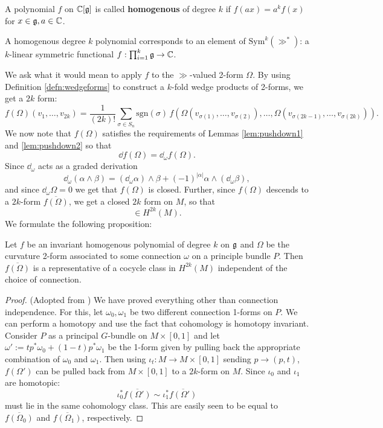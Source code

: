 		\begin{defn}
			A polynomial $f$ on $\mathbb{C}[\frak{g}]$ is called \textbf{homogenous} of degree $k$ if $f(a x) = a^k f(x)$ for $x \in \frak{g}, a \in \mathbb{C}$.
		\end{defn}
		
		\begin{obs}
			A homogenous degree $k$ polynomial corresponds to an element of $\mathrm{Sym}^k (\gg^*)$: a $k$-linear symmetric functional $f: \prod_{i=1}^k \frak{g} \to \mathbb{C}$.
		\end{obs}
		
		We ask what it would mean to apply $f$ to the $\gg$-valued 2-form $\Omega$. By using Definition \ref{defn:wedgeforms} to construct a $k$-fold wedge products of 2-forms, we get a $2k$ form:
		\[
			f(\Omega)(v_1, \dots, v_{2k}) = \frac{1}{(2k)!} \sum_{\sigma \in S_n} \mathrm{sgn}(\sigma)\, f\left(\Omega(v_{\sigma(1)}, \dots, v_{\sigma(2)}), \dots ,\Omega(v_{\sigma(2k-1)}, \dots, v_{\sigma(2k)})\right).
		\]
		We now note that $f(\Omega)$ satisfies the requirements of Lemmas \ref{lem:pushdown1} and \ref{lem:pushdown2} so that 
		\[
			\dd f(\Omega) = \dd_\omega f(\Omega).
		\]
		Since $\dd_\omega$ acts as a graded derivation
		\[
			\dd_\omega (\alpha \wedge \beta) = (\dd_\omega \alpha) \wedge \beta + (-1)^{|\alpha|} \alpha \wedge (\dd_\omega \beta),
		\]
		and since $\dd_\omega \Omega = 0$ we get that $f(\Omega)$ is closed. Further, since $f(\Omega)$ descends to a $2k$-form $\overline{f(\Omega)}$, we get a closed $2k$ form on $M$, so that
		\begin{equation}
			[\overline{f(\Omega)}] \in H^{2k} (M).
		\end{equation}
		We formulate the following proposition:
		\begin{theorem}
			Let $f$ be an invariant homogenous polynomial of degree $k$ on $\frak g$ and $\Omega$ be the curvature 2-form associated to some connection $\omega$ on a principle bundle $P$. Then $\overline{f(\Omega)}$ is a representative of a cocycle class in $H^{2k}(M)$ independent of the choice of connection.
		\label{thm:chern-weil}
		\end{theorem}
		\begin{proof}(Adopted from \cite{matthew2012})
			We have proved everything other than connection independence. For this, let $\omega_0, \omega_1$ be two different connection 1-forms on $P$. We can perform a homotopy and use the fact that cohomology is homotopy invariant. Consider $P$ as a principal $G$-bundle on $M \times [0, 1]$ and let $\omega':= t p^* \omega_0 + (1-t)  p^* \omega_1$ be the 1-form given by pulling back the appropriate combination of $\omega_0$ and $\omega_1$. Then using $\iota_t: M \to M \times [0,1]$ sending $p \to (p, t)$, $f(\Omega')$ can be pulled back from $M \times [0, 1]$ to a $2k$-form on $M$. Since $\iota_0$ and $\iota_1$ are homotopic:
			\[
				\iota_0^* \overline{f(\Omega')} \sim \iota_1^* \overline{f(\Omega')}
			\]
			must lie in the same cohomology class. This are easily seen to be equal to $\overline{f(\Omega_0)}$ and $\overline{f(\Omega_1)}$, respectively.
		\end{proof}

